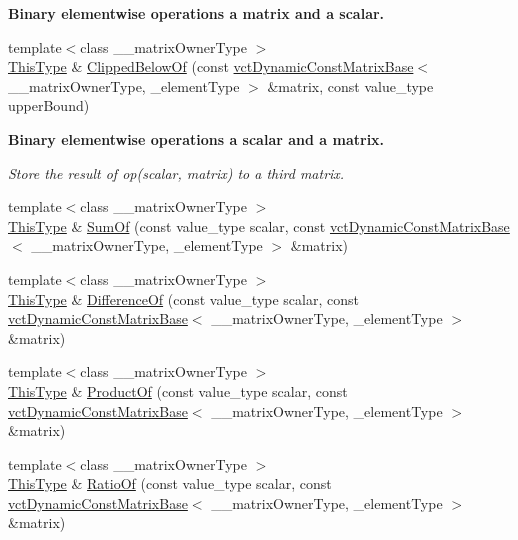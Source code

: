 \begin{Indent}{\bf Binary elementwise operations a matrix and a scalar.}
\begin{DoxyCompactItemize}
\item 
{\footnotesize template$<$class \+\_\+\+\_\+matrix\+Owner\+Type $>$ }\\\hyperlink{classvct_dynamic_const_matrix_base_ac4ff48cbe4d9de3fdef5a02447ffb9db}{This\+Type} \& \hyperlink{classvct_dynamic_matrix_base_ab9967c2bd33fe260b623dca4e998bb93}{Clipped\+Below\+Of} (const \hyperlink{classvct_dynamic_const_matrix_base}{vct\+Dynamic\+Const\+Matrix\+Base}$<$ \+\_\+\+\_\+matrix\+Owner\+Type, \+\_\+element\+Type $>$ \&matrix, const value\+\_\+type upper\+Bound)
\end{DoxyCompactItemize}
\end{Indent}
\begin{Indent}{\bf Binary elementwise operations a scalar and a matrix.}\par
{\em Store the result of op(scalar, matrix) to a third matrix. }\begin{DoxyCompactItemize}
\item 
{\footnotesize template$<$class \+\_\+\+\_\+matrix\+Owner\+Type $>$ }\\\hyperlink{classvct_dynamic_const_matrix_base_ac4ff48cbe4d9de3fdef5a02447ffb9db}{This\+Type} \& \hyperlink{classvct_dynamic_matrix_base_a9154f743f4d0671b93b7b09a9ce954be}{Sum\+Of} (const value\+\_\+type scalar, const \hyperlink{classvct_dynamic_const_matrix_base}{vct\+Dynamic\+Const\+Matrix\+Base}$<$ \+\_\+\+\_\+matrix\+Owner\+Type, \+\_\+element\+Type $>$ \&matrix)
\item 
{\footnotesize template$<$class \+\_\+\+\_\+matrix\+Owner\+Type $>$ }\\\hyperlink{classvct_dynamic_const_matrix_base_ac4ff48cbe4d9de3fdef5a02447ffb9db}{This\+Type} \& \hyperlink{classvct_dynamic_matrix_base_ab29865a31b49f75c51fc9dc275d09f15}{Difference\+Of} (const value\+\_\+type scalar, const \hyperlink{classvct_dynamic_const_matrix_base}{vct\+Dynamic\+Const\+Matrix\+Base}$<$ \+\_\+\+\_\+matrix\+Owner\+Type, \+\_\+element\+Type $>$ \&matrix)
\item 
{\footnotesize template$<$class \+\_\+\+\_\+matrix\+Owner\+Type $>$ }\\\hyperlink{classvct_dynamic_const_matrix_base_ac4ff48cbe4d9de3fdef5a02447ffb9db}{This\+Type} \& \hyperlink{classvct_dynamic_matrix_base_ada447fa096c78c038d70f0d1c445132a}{Product\+Of} (const value\+\_\+type scalar, const \hyperlink{classvct_dynamic_const_matrix_base}{vct\+Dynamic\+Const\+Matrix\+Base}$<$ \+\_\+\+\_\+matrix\+Owner\+Type, \+\_\+element\+Type $>$ \&matrix)
\item 
{\footnotesize template$<$class \+\_\+\+\_\+matrix\+Owner\+Type $>$ }\\\hyperlink{classvct_dynamic_const_matrix_base_ac4ff48cbe4d9de3fdef5a02447ffb9db}{This\+Type} \& \hyperlink{classvct_dynamic_matrix_base_a6b70c2d49a8bac26bd54792f849bab5a}{Ratio\+Of} (const value\+\_\+type scalar, const \hyperlink{classvct_dynamic_const_matrix_base}{vct\+Dynamic\+Const\+Matrix\+Base}$<$ \+\_\+\+\_\+matrix\+Owner\+Type, \+\_\+element\+Type $>$ \&matrix)

\end{DoxyCompactItemize}
\end{Indent}
